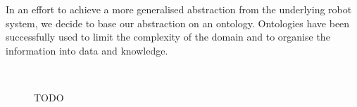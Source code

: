 In an effort to achieve a more generalised abstraction from the underlying robot system, we decide to base our abstraction on an ontology. Ontologies have been successfully used to limit the complexity of the domain and to organise the information into data and knowledge.

\begin{figure}[t]
    \myfloatalign
     \\
    \caption[TODO]{TODO}\label{fig:ros-onto}
\end{figure}

